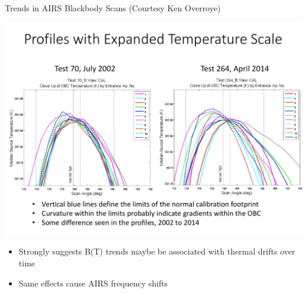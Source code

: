 \documentclass[10pt,t]{beamer}
\begin{document}
\begin{frame}[label={sec:org578b578}]{Trends in AIRS Blackbody Scans (Courtesy Ken Overroye)}
\vspace{-0.1in}
\begin{center}
\includegraphics[width=0.8\linewidth]{./Figs/Pdf/overroye_scan.pdf}
\end{center}

\begin{small}
\begin{itemize}
\item Strongly suggests B(T) trends maybe be associated with thermal drifts over time
\item Same effects cause AIRS frequency shifts
\end{itemize}
\end{small}
\end{frame}
\end{document}
